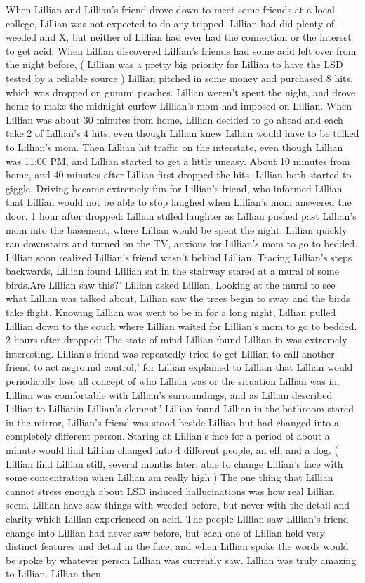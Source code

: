\documentclass[12pt]{book}
\begin{document}
When Lillian and Lillian's friend drove down to meet some friends at a local college, Lillian was not expected to do any tripped. Lillian had did plenty of weeded and X, but neither of Lillian had ever had the connection or the interest to get acid. When Lillian discovered Lillian's friends had some acid left over from the night before, ( Lillian was a pretty big priority for Lillian to have the LSD tested by a reliable source ) Lillian pitched in some money and purchased 8 hits, which was dropped on gummi peaches. Lillian weren't spent the night, and drove home to make the midnight curfew Lillian's mom had imposed on Lillian. When Lillian was about 30 minutes from home, Lillian decided to go ahead and each take 2 of Lillian's 4 hits, even though Lillian knew Lillian would have to be talked to Lillian's mom. Then Lillian hit traffic on the interstate, even though Lillian was 11:00 PM, and Lillian started to get a little uneasy. About 10 minutes from home, and 40 minutes after Lillian first dropped the hits, Lillian both started to giggle. Driving became extremely fun for Lillian's friend, who informed Lillian that Lillian would not be able to stop laughed when Lillian's mom answered the door. 1 hour after dropped: Lillian stifled laughter as Lillian pushed past Lillian's mom into the basement, where Lillian would be spent the night. Lillian quickly ran downstairs and turned on the TV, anxious for Lillian's mom to go to bedded. Lillian soon realized Lillian's friend wasn't behind Lillian. Tracing Lillian's steps backwards, Lillian found Lillian sat in the stairway stared at a mural of some birds.Are Lillian saw this?' Lillian asked Lillian. Looking at the mural to see what Lillian was talked about, Lillian saw the trees begin to sway and the birds take flight. Knowing Lillian was went to be in for a long night, Lillian pulled Lillian down to the couch where Lillian waited for Lillian's mom to go to bedded. 2 hours after dropped: The state of mind Lillian found Lillian in was extremely interesting. Lillian's friend was repeatedly tried to get Lillian to call another friend to act asground control,' for Lillian explained to Lillian that Lillian would periodically lose all concept of who Lillian was or the situation Lillian was in. Lillian was comfortable with Lillian's surroundings, and as Lillian described Lillian to Lillianin Lillian's element.' Lillian found Lillian in the bathroom stared in the mirror, Lillian's friend was stood beside Lillian but had changed into a completely different person. Staring at Lillian's face for a period of about a minute would find Lillian changed into 4 different people, an elf, and a dog. ( Lillian find Lillian still, several months later, able to change Lillian's face with some concentration when Lillian am really high ) The one thing that Lillian cannot stress enough about LSD induced hallucinations was how real Lillian seem. Lillian have saw things with weeded before, but never with the detail and clarity which Lillian experienced on acid. The people Lillian saw Lillian's friend change into Lillian had never saw before, but each one of Lillian held very distinct features and detail in the face, and when Lillian spoke the words would be spoke by whatever person Lillian was currently saw. Lillian was truly amazing to Lillian. Lillian then 
\end{document}
